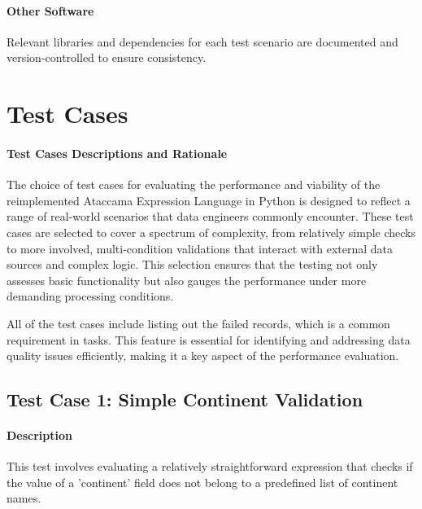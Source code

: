     \paragraph{Other Software} Relevant libraries and dependencies for each test scenario are documented and version-controlled to ensure consistency. 


\section{Test Cases}


\paragraph{Test Cases Descriptions and Rationale}

The choice of test cases for evaluating the performance and viability of the reimplemented Ataccama Expression Language in Python is designed to reflect a range of real-world scenarios that data engineers commonly encounter. These test cases are selected to cover a spectrum of complexity, from relatively simple checks to more involved, multi-condition validations that interact with external data sources and complex logic. This selection ensures that the testing not only assesses basic functionality but also gauges the performance under more demanding processing conditions.

All of the test cases include listing out the failed records, which is a common requirement in  tasks. This feature is essential for identifying and addressing data quality issues efficiently, making it a key aspect of the performance evaluation.

\subsection{Test Case 1: Simple Continent Validation}

\paragraph{Description} This test involves evaluating a relatively straightforward expression that checks if the value of a 'continent' field does not belong to a predefined list of continent names. 

